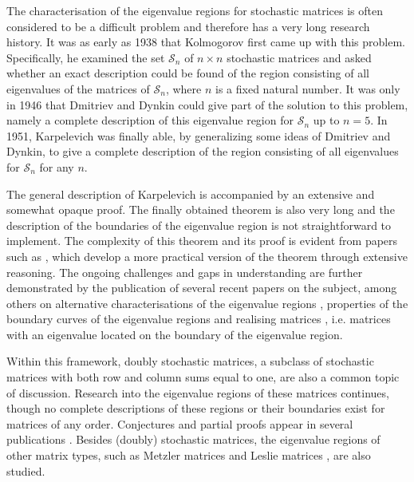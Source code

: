 \documentclass[11pt,a4paper]{article}
\theoremstyle{definition}
\theoremstyle{remark}
\begin{document}
The characterisation of the eigenvalue regions for stochastic matrices is often considered to be a difficult problem and therefore has a very long research history. It was as early as 1938 that Kolmogorov first came up with this problem. Specifically, he examined the set $\mathcal{S}_n$ of $n \times n$ stochastic matrices and asked whether an exact description could be found of the region consisting of all eigenvalues of the matrices of $\mathcal{S}_n$, where $n$ is a fixed natural number. It was only in 1946 that Dmitriev and Dynkin \cite{Dynkin} could give part of the solution to this problem, namely a complete description of this eigenvalue region for $\mathcal{S}_n$ up to $n=5$. In 1951, Karpelevich \cite{Karpelevich} was finally able, by generalizing some ideas of Dmitriev and Dynkin, to give a complete description of the region consisting of all eigenvalues for $\mathcal{S}_n$ for any $n$.

The general description of Karpelevich is accompanied by an extensive and somewhat opaque proof. The finally obtained theorem is also very long and the description of the boundaries of the eigenvalue region is not straightforward to implement. The complexity of this theorem and its proof is evident from papers such as \cite{ito1997new, djokovic1990cyclic, munger2024demystifying}, which develop a more practical version of the theorem through extensive reasoning. The ongoing challenges and gaps in understanding are further demonstrated by the publication of several recent papers on the subject, among others on alternative characterisations of the eigenvalue regions \cite{kirkland2020karpelevivc}, properties of the boundary curves of the eigenvalue regions \cite{kim2020proofs, joshi2024powers} and realising matrices \cite{kirkland2022stochastic, johnson2017matricial}, i.e. matrices with an eigenvalue located on the boundary of the eigenvalue region.

Within this framework, doubly stochastic matrices, a subclass of stochastic matrices with both row and column sums equal to one, are also a common topic of discussion. Research into the eigenvalue regions of these matrices continues, though no complete descriptions of these regions or their boundaries exist for matrices of any order. Conjectures and partial proofs appear in several publications \cite{mashreghi2007conjecture, harlev2022doubly, kim2022conjectures, fiedler1972bounds, hwang2004inverse, marcus1962some, mourad2012spectral, rehman2020spectral, mandal2019eigenvalue}. Besides (doubly) stochastic matrices, the eigenvalue regions of other matrix types, such as Metzler matrices \cite{domka2022spectrum} and Leslie matrices \cite{kirkland1992eigenvalue}, are also studied.
\end{document}
